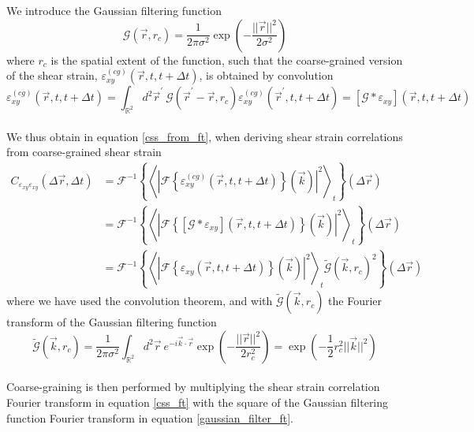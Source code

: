 \documentclass[class=report, float=false, crop=false]{standalone}
\begin{document}
We introduce the Gaussian filtering function
\begin{equation}
\mathcal{G}(\vec{r}, r_c) = \frac{1}{2\pi\sigma^2}\exp\left(-\frac{||\vec{r}||^2}{2\sigma^2}\right)
\end{equation}
where $r_c$ is the spatial extent of the function, such that the coarse-grained version of the shear strain, $\varepsilon_{xy}^{(cg)}(\vec{r}, t, t + \Delta t)$, is obtained by convolution
\begin{equation}
\varepsilon_{xy}^{(cg)}(\vec{r}, t, t + \Delta t) = \int_{\mathbb{R}^2} d^2\vec{r}^{\prime}~ \mathcal{G}(\vec{r}^{\prime} - \vec{r}, r_c) \varepsilon_{xy}^{(cg)}(\vec{r}^{\prime}, t, t + \Delta t) = \left[\mathcal{G}\ast\varepsilon_{xy}\right](\vec{r}, t, t + \Delta t)
\end{equation}
\mbox{}\\

We thus obtain in equation \ref{css_from_ft}, when deriving shear strain correlations from coarse-grained shear strain
\begin{equation}
\begin{aligned}
C_{\varepsilon_{xy}\varepsilon_{xy}}(\Delta \vec{r}, \Delta t) &= \mathcal{F}^{-1}\left\{\left<|\mathcal{F}\left\{\varepsilon_{xy}^{(cg)}(\vec{r}, t, t + \Delta t)\right\}(\vec{k})|^2\right>_t\right\}(\Delta \vec{r})\\
&= \mathcal{F}^{-1}\left\{\left<|\mathcal{F}\left\{\left[\mathcal{G}\ast\varepsilon_{xy}\right](\vec{r}, t, t + \Delta t)\right\}(\vec{k})|^2\right>_t\right\}(\Delta \vec{r})\\
&= \mathcal{F}^{-1}\left\{\left<|\mathcal{F}\left\{\varepsilon_{xy}(\vec{r}, t, t + \Delta t)\right\}(\vec{k})|^2\right>_t\tilde{\mathcal{G}}(\vec{k}, r_c)^2\right\}(\Delta \vec{r})
\end{aligned}
\end{equation}
where we have used the convolution theorem, and with $\tilde{\mathcal{G}}(\vec{k}, r_c)$ the Fourier transform of the Gaussian filtering function
\begin{equation}
\tilde{\mathcal{G}}(\vec{k}, r_c) =  \frac{1}{2\pi\sigma^2} \int_{\mathbb{R}^2} d^2\vec{r}~ e^{-i\vec{k}\cdot\vec{r}}\exp\left(-\frac{||\vec{r}||^2}{2r_c^2}\right) = \exp\left(-\frac{1}{2}r_c^2||\vec{k}||^2\right)
\label{gaussian_filter_ft}
\end{equation}
\mbox{}\\

Coarse-graining is then performed by multiplying the shear strain correlation Fourier transform in equation \ref{css_ft} with the square of the Gaussian filtering function Fourier transform in equation \ref{gaussian_filter_ft}.
\end{document}
